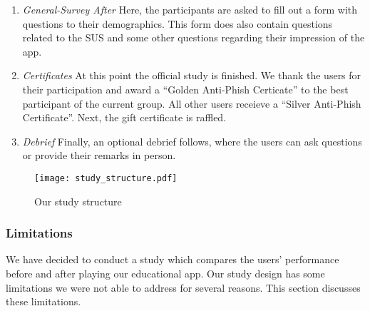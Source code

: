 \begin{enumerate}
	\item \textit{General-Survey After} Here, the participants are asked to fill out a form with questions to their demographics.
 This form does also contain questions related to the SUS and some other questions regarding their impression of the app.
	
	\item \textit{Certificates} At this point the official study is finished.
We thank the users for their participation and award a ``Golden Anti-Phish Certicate'' to the best participant of the current group.
All other users receieve a ``Silver Anti-Phish Certificate''.
Next, the gift certificate is raffled.

	\item \textit{Debrief} Finally, an optional debrief follows, where the users can ask questions or provide their remarks in person.

\end{enumerate}



\begin{figure}[hHtbp]
\centering
\texttt{[image: study\_structure.pdf]}%
\caption{Our study structure}%
\label{fig:study_structure}%
\end{figure}

\subsubsection{Limitations}
We have decided to conduct a study which compares the users' performance before and after playing our educational app.
Our study design has some limitations we were not able to address for several reasons.
This section discusses these limitations.


